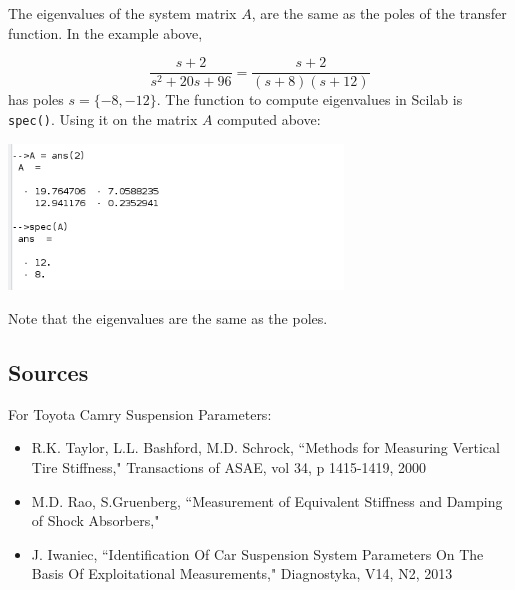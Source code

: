 The eigenvalues of the system matrix $A$, are the same as the poles of the transfer function. 
 In the example above, 
 
\[
\frac{s+2}{s^2+20s+96} = \frac{s+2}{(s+8)(s+12)}
\]
has poles $s=\{-8,-12\}$.    The function to compute eigenvalues in Scilab is {\tt spec()}.  Using
it on the matrix $A$ computed above:

\begin{center}
\includegraphics[width=3.5in]{figs04/ss_eigenvals.png}
\end{center}

Note that the eigenvalues are the same as the poles.  
% 
% 


\subsection{Sources}
For Toyota Camry Suspension Parameters:
\begin{itemize}
    \item R.K. Taylor, L.L. Bashford, M.D. Schrock, ``Methods for Measuring Vertical Tire Stiffness,"
    Transactions of ASAE, vol 34, p 1415-1419, 2000
    \item M.D. Rao, S.Gruenberg, ``Measurement of Equivalent Stiffness and Damping of Shock Absorbers,"
    \item J. Iwaniec, ``Identification Of Car Suspension System Parameters On The Basis Of Exploitational Measurements," Diagnostyka, V14, N2, 2013
\end{itemize}

